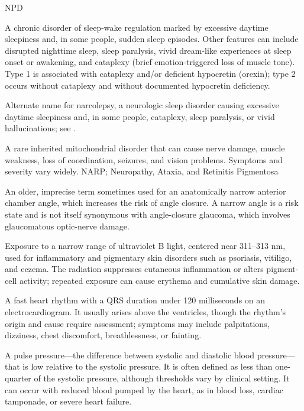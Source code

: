 \synonyms
NPD

 A chronic disorder of sleep-wake regulation marked by excessive daytime sleepiness and, in some people, sudden sleep episodes. Other features can include disrupted nighttime sleep, sleep paralysis, vivid dream-like experiences at sleep onset or awakening, and cataplexy (brief emotion-triggered loss of muscle tone). Type 1 is associated with cataplexy and/or deficient hypocretin (orexin); type 2 occurs without cataplexy and without documented hypocretin deficiency.

 Alternate name for narcolepsy, a neurologic sleep disorder causing excessive daytime sleepiness and, in some people, cataplexy, sleep paralysis, or vivid hallucinations; see .

 A rare inherited mitochondrial disorder that can cause nerve damage, muscle weakness, loss of coordination, seizures, and vision problems. Symptoms and severity vary widely.
\synonyms
NARP; Neuropathy, Ataxia, and Retinitis Pigmentosa

 An older, imprecise term sometimes used for an anatomically narrow anterior chamber angle, which increases the risk of angle closure. A narrow angle is a risk state and is not itself synonymous with angle-closure glaucoma, which involves glaucomatous optic-nerve damage.

 Exposure to a narrow range of ultraviolet B light, centered near 311–313 nm, used for inflammatory and pigmentary skin disorders such as psoriasis, vitiligo, and eczema. The radiation suppresses cutaneous inflammation or alters pigment-cell activity; repeated exposure can cause erythema and cumulative skin damage.

 A fast heart rhythm with a QRS duration under 120 milliseconds on an electrocardiogram. It usually arises above the ventricles, though the rhythm's origin and cause require assessment; symptoms may include palpitations, dizziness, chest discomfort, breathlessness, or fainting.

 A pulse pressure—the difference between systolic and diastolic blood pressure—that is low relative to the systolic pressure. It is often defined as less than one-quarter of the systolic pressure, although thresholds vary by clinical setting. It can occur with reduced blood pumped by the heart, as in blood loss, cardiac tamponade, or severe heart failure.

